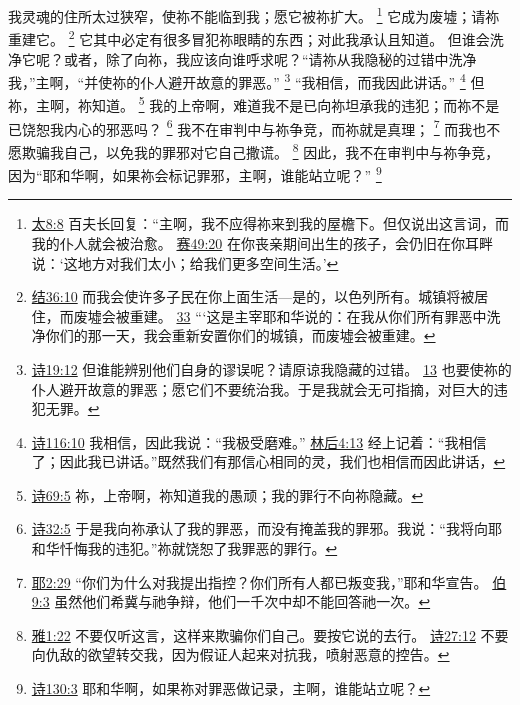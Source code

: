 \documentclass[12pt, a4paper, oneside]{ctexart}
\newcounter{parnum}[section]
\newcommand{\N}{%
   \noindent\refstepcounter{parnum}%
    \makebox[\parindent][l]{\textbf{\arabic{parnum}.}}}
\begin{document}
\N 我灵魂的住所太过狭窄，使祢不能临到我；愿它被祢扩大。
    \footnote {
        \href{https://biblehub.com/matthew/8-8.htm}{太8:8} 百夫长回复：“主啊，我不应得祢来到我的屋檐下。但仅说出这言词，而我的仆人就会被治愈。
        \href{https://biblehub.com/isaiah/49-20.htm}{赛49:20} 在你丧亲期间出生的孩子，会仍旧在你耳畔说：‘这地方对我们太小；给我们更多空间生活。’
	}
	它成为废墟；请祢重建它。
    \footnote {
        \href{https://biblehub.com/ezekiel/36-10.htm}{结36:10} 而我会使许多子民在你上面生活---是的，以色列所有。城镇将被居住，而废墟会被重建。
        \href{https://biblehub.com/ezekiel/36-33.htm}{33} “‘这是主宰耶和华说的：在我从你们所有罪恶中洗净你们的那一天，我会重新安置你们的城镇，而废墟会被重建。
	}
	它其中必定有很多冒犯祢眼睛的东西；对此我承认且知道。
	但谁会洗净它呢？或者，除了向祢，我应该向谁呼求呢？“请祢从我隐秘的过错中洗净我，”主啊，“并使祢的仆人避开故意的罪恶。”
    \footnote {
        \href{https://biblehub.com/psalms/19-12.htm}{诗19:12} 但谁能辨别他们自身的谬误呢？请原谅我隐藏的过错。
        \href{https://biblehub.com/psalms/19-13.htm}{13} 也要使祢的仆人避开故意的罪恶；愿它们不要统治我。于是我就会无可指摘，对巨大的违犯无罪。
	}
	“我相信，而我因此讲话。”
    \footnote {
        \href{https://biblehub.com/psalms/116-10.htm}{诗116:10} 我相信，因此我说：“我极受磨难。”
        \href{https://biblehub.com/2_corinthians/4-13.htm}{林后4:13} 经上记着：“我相信了；因此我已讲话。”既然我们有那信心相同的灵，我们也相信而因此讲话，
	}
	但祢，主啊，祢知道。
    \footnote {
        \href{https://biblehub.com/psalms/69-5.htm}{诗69:5} 祢，上帝啊，祢知道我的愚顽；我的罪行不向祢隐藏。
	}
	我的上帝啊，难道我不是已向祢坦承我的违犯；而祢不是已饶恕我内心的邪恶吗？
    \footnote {
        \href{https://biblehub.com/psalms/32-5.htm}{诗32:5} 于是我向祢承认了我的罪恶，而没有掩盖我的罪邪。我说：“我将向耶和华忏悔我的违犯。”祢就饶恕了我罪恶的罪行。
	}
	我不在审判中与祢争竞，而祢就是真理；
    \footnote {
        \href{https://biblehub.com/jeremiah/2-29.htm}{耶2:29} “你们为什么对我提出指控？你们所有人都已叛变我，”耶和华宣告。
        \href{https://biblehub.com/job/9-3.htm}{伯9:3} 虽然他们希冀与祂争辩，他们一千次中却不能回答祂一次。
	}
    而我也不愿欺骗我自己，以免我的罪邪对它自己撒谎。
    \footnote {
        \href{https://biblehub.com/james/1-22.htm}{雅1:22} 不要仅听这言，这样来欺骗你们自己。要按它说的去行。
        \href{https://biblehub.com/psalms/27-12.htm}{诗27:12} 不要向仇敌的欲望转交我，因为假证人起来对抗我，喷射恶意的控告。
	}
	因此，我不在审判中与祢争竞，因为“耶和华啊，如果祢会标记罪邪，主啊，谁能站立呢？”
    \footnote {
        \href{https://biblehub.com/psalms/130-3.htm}{诗130:3} 耶和华啊，如果祢对罪恶做记录，主啊，谁能站立呢？
	}
\end{document}
